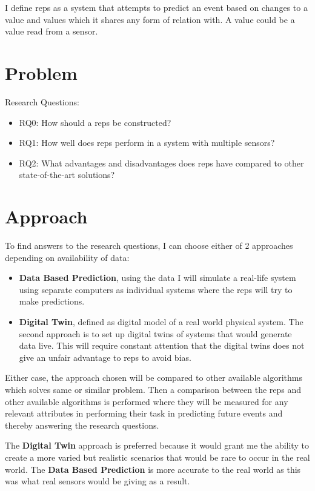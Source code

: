 \documentclass[a4paper,8pt]{article}
\begin{document}
		I define \gls{reps} as a system that attempts to predict an event based on changes to a value and values which it shares any form of relation with. A value could be a value read from a sensor.

	\section{Problem}
		Research Questions:
		\begin{itemize}
			\item RQ0: How should a \gls{reps} be constructed?
			\item RQ1: How well does \gls{reps} perform in a system with multiple sensors?
			\item RQ2: What advantages and disadvantages does \gls{reps} have compared to other state-of-the-art solutions?
		\end{itemize}
	\newpage
	\section{Approach}
		To find answers to the research questions, I can choose either of 2 approaches depending on availability of data: 
		\begin{itemize}
			\item \textbf{Data Based Prediction}, using the data I will simulate a real-life system using separate computers as individual systems where the \gls{reps} will try to make predictions.
			\item \textbf{Digital Twin}, defined as digital model of a real world physical system. The second approach is to set up digital twins of systems that would generate data live. This will require constant attention that the digital twins does not give an unfair advantage to \gls{reps} to avoid bias.
		\end{itemize}
		Either case, the approach chosen will be compared to other available algorithms which solves same or similar problem.
		Then a comparison between the \gls{reps} and other available algorithms is performed where they will be measured for any relevant attributes in performing their task in predicting future events and thereby answering the research questions.
		
		The \textbf{Digital Twin} approach is preferred because it would grant me the ability to create a more varied but realistic scenarios that would be rare to occur in the real world. The \textbf{Data Based Prediction} is more accurate to the real world as this was what real sensors would be giving as a result.
\end{document}
